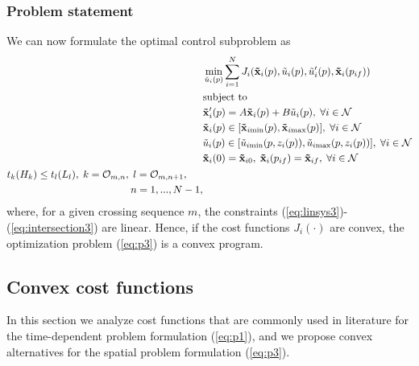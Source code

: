 \documentclass[letterpaper,10pt,conference]{ieeeconf}
\begin{document}
\subsubsection{Problem statement} We can now formulate the optimal control subproblem as
\begin{subequations} \label{eq:p3}
\begin{align}
&\min_{\tilde u_i(p)} \sum_{i=1}^N J_i(\mathbf{\tilde x}_i(p),\tilde u_i(p),\tilde u'_i(p), \mathbf{\tilde x}_i(p_{if}))\\
&\text{subject to} \nonumber\\
&\mathbf{\tilde x'}_i(p)=A \mathbf{\tilde x}_i(p)+ B \tilde u_i(p), \; \forall i \in \mathcal{N} \label{eq:linsys3}\\
&\mathbf{\tilde x}_i(p) \in [\mathbf{\tilde x}_{i\text{min}}(p), \mathbf{\tilde x}_{i\text{max}}(p)], \; \forall i \in \mathcal{N}\\
&\tilde u_i(p) \in [\tilde u_{i\text{min}}(p,z_i(p)), \tilde u_{i\text{max}}(p,z_i(p))], \; \forall i \in \mathcal{N}\\
&\mathbf{\tilde x}_i(0)=\mathbf{\tilde x}_{i0}, \; \mathbf{\tilde x}_i(p_{if})=\mathbf{\tilde x}_{if}, \; \forall i \in \mathcal{N}\\
\begin{split} \label{eq:intersection3}
&t_k(H_k) \leq t_l(L_l), \; k=\mathcal{O}_{m,n}, \; l=\mathcal{O}_{m,n+1}, \\
&\hspace{42.5mm}n=1,...,N-1,
\end{split}
\end{align}
\end{subequations}%
where, for a given crossing sequence $m$, the constraints (\ref{eq:linsys3})-(\ref{eq:intersection3}) are linear. Hence, if the cost functions $J_i(\cdot)$ are convex, the optimization problem (\ref{eq:p3}) is a convex program.

\subsection{Convex cost functions} \label{sec:objective}
In this section we analyze cost functions that are commonly used in literature for the time-dependent problem formulation (\ref{eq:p1}), and we propose convex alternatives for the spatial problem formulation (\ref{eq:p3}).
\end{document}
